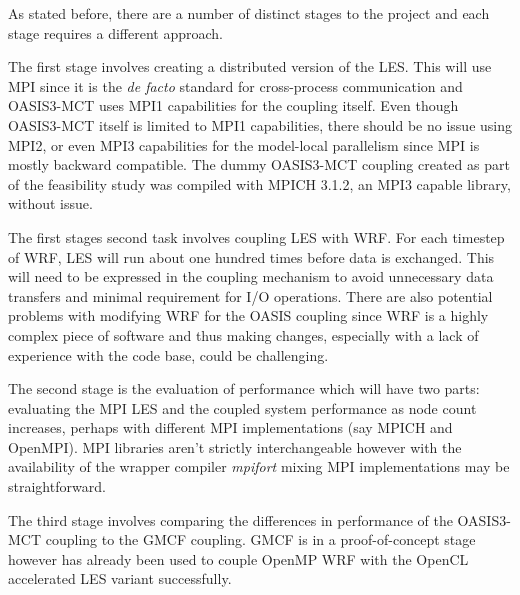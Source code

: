 As stated before, there are a number of distinct stages to the project and each
stage requires a different approach.

The first stage involves creating a distributed version of the LES. This will
use MPI since it is the \textit{de facto} standard for cross-process
communication and OASIS3-MCT uses MPI1 capabilities for the coupling itself.
Even though OASIS3-MCT itself is limited to MPI1 capabilities, there should be
no issue using MPI2, or even MPI3 capabilities for the model-local parallelism
since MPI is mostly backward compatible. The dummy OASIS3-MCT coupling created
as part of the feasibility study was compiled with MPICH 3.1.2, an MPI3 capable
library, without issue.

The first stages second task involves coupling LES with WRF. For each timestep
of WRF, LES will run about one hundred times before data is exchanged. This will
need to be expressed in the coupling mechanism to avoid unnecessary data
transfers and minimal requirement for I/O operations. There are also potential
problems with modifying WRF for the OASIS coupling since WRF is a highly complex
piece of software and thus making changes, especially with a lack of experience
with the code base, could be challenging.

The second stage is the evaluation of performance which will have two parts:
evaluating the MPI LES and the coupled system performance as node count
increases, perhaps with different MPI implementations (say MPICH and OpenMPI).
MPI libraries aren't strictly interchangeable however with the availability of
the wrapper compiler \textit{mpifort} mixing MPI implementations may be
straightforward.

The third stage involves comparing the differences in performance of the
OASIS3-MCT coupling to the GMCF coupling. GMCF is in a proof-of-concept stage
however has already been used to couple OpenMP WRF with the OpenCL accelerated
LES variant successfully.
